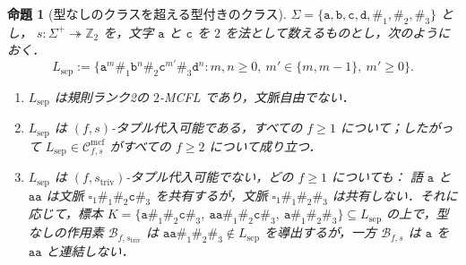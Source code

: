 \documentclass[11pt,a4paper]{ltjsarticle}
\numberwithin{equation}{section}
\theoremstyle{plain}
\newtheorem{proposition}[theorem]{命題}
\theoremstyle{definition}
\theoremstyle{remark}
\newcommand{\Cmcf}[2]{\mathcal{C}^{\mathrm{mcf}}_{#1,#2}}
\newcommand{\blank}{\square}
\theoremstyle{plain}
\begin{document}
\begin{proposition}[型なしのクラスを超える型付きのクラス]
\label{prop:typed-separation}
$\Sigma=\{\mathtt a,\mathtt b,\mathtt c,\mathtt d,\mathtt\#_1,\mathtt\#_2,\mathtt\#_3\}$ とし，
$s:\Sigma^+\twoheadrightarrow\mathbb Z_2$ を，文字 $\mathtt a$ と $\mathtt c$ を
$2$ を法として数えるものとし，次のようにおく．
\[
 L_{\mathrm{sep}}:=\{\mathtt a^m\mathtt\#_1\mathtt b^n\mathtt\#_2\mathtt c^{m'}\mathtt\#_3\mathtt d^n:
 m,n\ge0,\ m'\in\{m,m-1\},\ m'\ge0\}.
\]
\begin{enumerate}[label=\textup{(\roman*)},leftmargin=*]
\item $L_{\mathrm{sep}}$ は規則ランク2の $2$-MCFL であり，文脈自由でない．
\item $L_{\mathrm{sep}}$ は $(f,s)$-タプル代入可能である，すべての $f\ge1$ について；したがって
$L_{\mathrm{sep}}\in\Cmcf{f}{s}$ がすべての $f\ge2$ について成り立つ．
\item $L_{\mathrm{sep}}$ は $(f,s_{\mathrm{triv}})$-タプル代入可能でない，どの $f\ge1$ についても：
語 $\mathtt a$ と $\mathtt a\mathtt a$ は文脈
$\blank_1\mathtt\#_1\mathtt\#_2\mathtt c\mathtt\#_3$ を共有するが，文脈
$\blank_1\mathtt\#_1\mathtt\#_2\mathtt\#_3$ は共有しない．それに応じて，標本
$K=\{\mathtt a\mathtt\#_1\mathtt\#_2\mathtt c\mathtt\#_3,\
\mathtt a\mathtt a\mathtt\#_1\mathtt\#_2\mathtt c\mathtt\#_3,\
\mathtt a\mathtt\#_1\mathtt\#_2\mathtt\#_3\}\subseteq L_{\mathrm{sep}}$ の上で，型なしの作用素
$\mathcal B_{f,s_{\mathrm{triv}}}$ は
$\mathtt a\mathtt a\mathtt\#_1\mathtt\#_2\mathtt\#_3\notin L_{\mathrm{sep}}$ を導出するが，一方
$\mathcal B_{f,s}$ は $\mathtt a$ を $\mathtt a\mathtt a$ と連結しない．
\end{enumerate}
\end{proposition}
\end{document}
